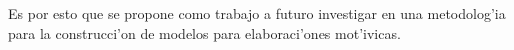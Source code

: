 Es por esto que se propone como trabajo a futuro investigar en una metodolog'ia para la construcci'on de modelos para elaboraci'ones mot'ivicas.


%
%
%
%
